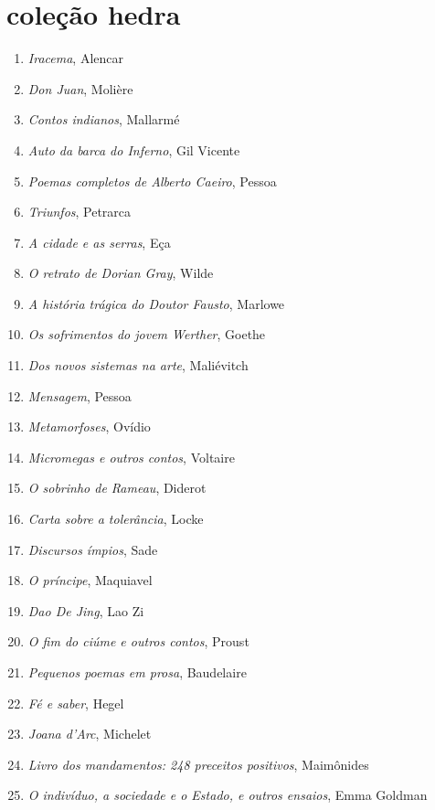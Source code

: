 \ifodd\thepage\paginabranca\else\clearpage\fi
\pagestyle{empty}

\begingroup
\fontsize{7}{8}\selectfont
\section{coleção hedra}
\begin{enumerate}
\setlength\parskip{4.2pt}
\setlength\itemsep{-1.4mm}
\item \textit{Iracema}, Alencar
\item \textit{Don Juan}, Molière
\item \textit{Contos indianos}, Mallarmé
\item \textit{Auto da barca do Inferno}, Gil Vicente
\item \textit{Poemas completos de Alberto Caeiro}, Pessoa
\item \textit{Triunfos}, Petrarca
\item \textit{A cidade e as serras}, Eça
\item \textit{O retrato de Dorian Gray}, Wilde
\item \textit{A história trágica do Doutor Fausto}, Marlowe
\item \textit{Os sofrimentos do jovem Werther}, Goethe
\item \textit{Dos novos sistemas na arte}, Maliévitch
\item \textit{Mensagem}, Pessoa
\item \textit{Metamorfoses}, Ovídio
\item \textit{Micromegas e outros contos}, Voltaire
\item \textit{O sobrinho de Rameau}, Diderot
\item \textit{Carta sobre a tolerância}, Locke
\item \textit{Discursos ímpios}, Sade
\item \textit{O príncipe}, Maquiavel
\item \textit{Dao De Jing}, Lao Zi
\item \textit{O fim do ciúme e outros contos}, Proust
\item \textit{Pequenos poemas em prosa}, Baudelaire
\item \textit{Fé e saber}, Hegel
\item \textit{Joana d'Arc}, Michelet
\item \textit{Livro dos mandamentos: 248 preceitos positivos}, Maimônides
\item \textit{O indivíduo, a sociedade e o Estado, e outros ensaios}, Emma Goldman

\end{enumerate}
